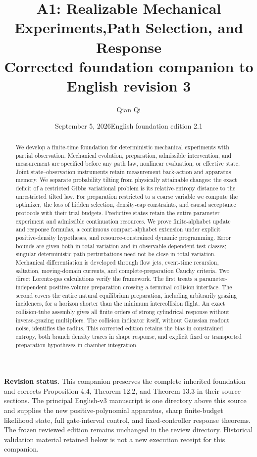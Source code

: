 \documentclass[11pt,a4paper]{article}
\title{\textbf{A1: Realizable Mechanical Experiments,\newline Path Selection, and Response}\\[0.5em]\large Corrected foundation companion to English revision 3}
\author{Qian Qi}
\date{September 5, 2026\quad English foundation edition 2.1}
\theoremstyle{definition}
\theoremstyle{remark}\newtheorem{remark}[theorem]{Remark}
\begin{document}
\maketitle
\noindent\textbf{Revision status.} This companion preserves the complete inherited foundation and corrects Proposition 4.4, Theorem 12.2, and Theorem 13.3 in their source sections. The principal English-v3 manuscript is one directory above this source and supplies the new positive-polynomial apparatus, sharp finite-budget likelihood state, full gate-interval control, and fixed-controller response theorems. The frozen reviewed edition remains unchanged in the review directory. Historical validation material retained below is not a new execution receipt for this companion.
\begin{abstract}
We develop a finite-time foundation for deterministic mechanical experiments with partial observation. Mechanical evolution, preparation, admissible intervention, and measurement are specified before any path law, nonlinear evaluation, or effective state. Joint state--observation instruments retain measurement back-action and apparatus memory. We separate probability tilting from physically attainable changes: the exact deficit of a restricted Gibbs variational problem is its relative-entropy distance to the unrestricted tilted law. For preparation restricted to a coarse variable we compute the optimizer, the loss of hidden selection, density-cap constraints, and causal acceptance protocols with their trial budgets. Predictive states retain the entire parameter experiment and admissible continuation resources. We prove finite-alphabet update and response formulas, a continuous compact-alphabet extension under explicit positive-density hypotheses, and resource-constrained dynamic programming. Error bounds are given both in total variation and in observable-dependent test classes; singular deterministic path perturbations need not be close in total variation. Mechanical differentiation is developed through flow jets, event-time recursion, saltation, moving-domain currents, and complete-preparation Cauchy criteria. Two direct Lorentz-gas calculations verify the framework. The first treats a parameter-independent positive-volume preparation crossing a terminal collision interface. The second covers the entire natural equilibrium preparation, including arbitrarily grazing incidences, for a horizon shorter than the minimum intercollision flight. An exact collision-tube assembly gives all finite orders of strong cylindrical response without inverse-grazing multipliers. The collision indicator itself, without Gaussian readout noise, identifies the radius. This corrected edition retains the bias in constrained entropy, both branch density traces in shape response, and explicit fixed or transported preparation hypotheses in chamber integration.
\end{abstract}
\end{document}
